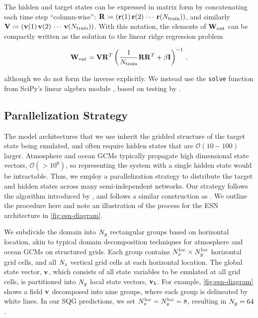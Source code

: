 The hidden and target states can be expressed in matrix form by concatenating
each time step ``column-wise'':
$\mathbf{R} \coloneqq (\mathbf{r}(1) \, \mathbf{r}(2) \, \cdots \, \mathbf{r}(N_\text{train}))$,
and similarly\\
\noindent$\mathbf{V} \coloneqq (\mathbf{v}(1) \, \mathbf{v}(2) \, \cdots \, \mathbf{v}(N_\text{train}))$.
With this notation, the elements of $\mathbf{W}_\text{out}$ can be compactly written as the
solution to the linear ridge regression problem
\begin{linenomath*}\begin{equation}
    \mathbf{W}_\text{out} = \mathbf{V} \mathbf{R}^T \left(\dfrac{1}{N_\text{train}}\mathbf{R}\mathbf{R}^T +
    \beta\mathbf{I}\right)^{-1} \, ,
    \label{eq:ridge_regression}
\end{equation}\end{linenomath*}
although we do not form the inverse explicitly.
We instead use the \texttt{solve} function from SciPy's linear algebra module
\citep{scipy_2020}, based on testing by
\citet{platt_systematic_2022}.


\subsection{Parallelization Strategy}
\label{subsec:parallelization}

The model architectures that we use inherit the gridded structure of the target
state being emulated, and often require hidden states that are
$\mathcal{O}(10-100)$ larger.
Atmosphere and ocean GCMs typically propagate high dimensional state vectors,
$\mathcal{O}(>10^6)$,
so representing the system with a single hidden state would be intractable.
Thus, we employ a parallelization strategy to distribute the target and hidden
states across many semi-independent networks.
Our strategy follows the algorithm introduced by \citet{pathak_model-free_2018},
and follows a similar construction as \citet{arcomano_machine_2020}.
We outline the procedure here and note an illustration of the process for
the ESN architecture in \cref{fig:esn-diagram}.

We subdivide the domain into $N_{g}$ rectangular groups based on horizontal location,
akin to typical domain decomposition techniques for atmosphere and ocean
GCMs on structured grids.
Each group contains
$N_{x}^\text{loc}\times N_{y}^\text{loc}$ horizontal grid cells, and all $N_{z}$
vertical grid cells at each horizontal location.
The global state vector, $\mathbf{v}$, which consists of all state variables to be
emulated at all grid cells, is partitioned into $N_{g}$ local state vectors,
$\mathbf{v}_{k}$.
For example, \cref{fig:esn-diagram} shows a field $\mathbf{v}$ decomposed into nine
groups, where each group is delineated by white lines.
In our SQG predictions, we set $N_{x}^\text{loc} = N_{y}^\text{loc} = 8$, resulting in
$N_{g}=64$.

